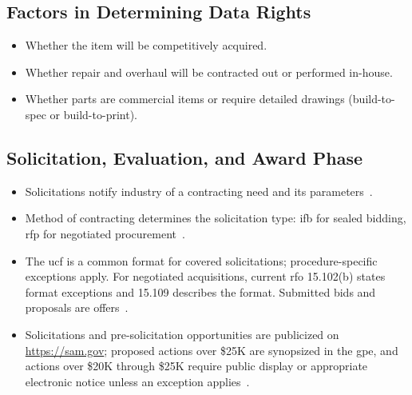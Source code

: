 \documentclass[../main.tex]{subfiles}
\begin{document}

\subsection{Factors in Determining Data Rights}
\begin{itemize}
  \item Whether the item will be competitively acquired.
  \item Whether repair and overhaul will be contracted out or performed in-house.
  \item Whether parts are commercial items or require detailed drawings (build-to-spec or build-to-print).
\end{itemize}

\subsection{Solicitation, Evaluation, and Award Phase}
\begin{itemize}
  \item Solicitations notify industry of a contracting need and its parameters~\autocite{edo-3-2-2-solicitation-prep-2025}.
  \item Method of contracting determines the solicitation type: \ac{ifb} for sealed bidding, \ac{rfp} for negotiated procurement~\autocite{edo-3-2-2-solicitation-prep-2025}.
  \item The \ac{ucf} is a common format for covered solicitations; procedure-specific exceptions apply. For negotiated acquisitions, current \ac{rfo} 15.102(b) states format exceptions and 15.109 describes the format. Submitted bids and proposals are offers~\autocite{edo-3-2-2-solicitation-prep-2025,FAR-Overhaul-Part15-2026}.
  \item Solicitations and pre-solicitation opportunities are publicized on \url{https://sam.gov}; proposed actions over \$25K are synopsized in the \ac{gpe}, and actions over \$20K through \$25K require public display or appropriate electronic notice unless an exception applies~\autocite{edo-3-2-2-solicitation-prep-2025,FAR-5-101-Disseminating-Information}.
\end{itemize}
\end{document}
